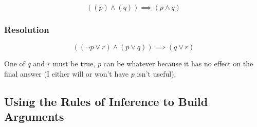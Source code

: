 \begin{minipage}{0.45\linewidth}
\end{minipage}
\hfill
\begin{minipage}{0.45\linewidth}
    \[
        ((p) \land (q)) \implies (p \land q)
    \]
\end{minipage}

\subsubsection{Resolution}\label{ssub:resolution}

\begin{minipage}{0.45\linewidth}
\end{minipage}
\hfill
\begin{minipage}{0.45\linewidth}
    \[
        \left( (\neg p \lor r) \land (p \lor q) \right) \implies(q \lor r)
    \]
\end{minipage}

\begin{note}
    One of \(q\) and \(r\) must be true, \(p\) can be whatever because it has no effect on the final answer (I either will or won't have \(p\) isn't useful).
\end{note}

\subsection{Using the Rules of Inference to Build Arguments}\label{sub:using_the_rules_of_inference_to_build_arguments}

